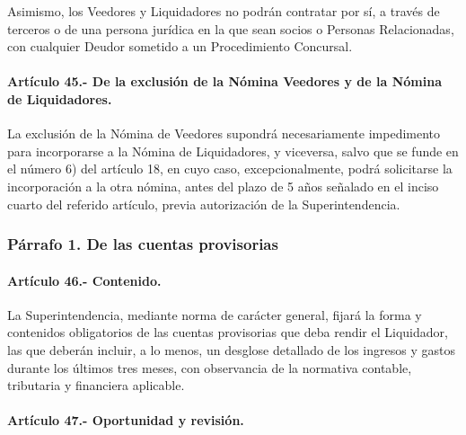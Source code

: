 \documentclass[
]{book}
\begin{document}
Asimismo, los Veedores y Liquidadores no podrán contratar por sí, a través de terceros o de una persona jurídica en la que sean socios o Personas Relacionadas, con cualquier Deudor sometido a un Procedimiento Concursal.

\hypertarget{artuxedculo-45.--de-la-exclusiuxf3n-de-la-nuxf3mina-veedores-y-de-la-nuxf3mina-de-liquidadores.}{%
\paragraph*{Artículo 45.- De la exclusión de la Nómina Veedores y de la Nómina de Liquidadores.}\label{artuxedculo-45.--de-la-exclusiuxf3n-de-la-nuxf3mina-veedores-y-de-la-nuxf3mina-de-liquidadores.}}

La exclusión de la Nómina de Veedores supondrá necesariamente impedimento para incorporarse a la Nómina de Liquidadores, y viceversa, salvo que se funde en el número 6) del artículo 18, en cuyo caso, excepcionalmente, podrá solicitarse la incorporación a la otra nómina, antes del plazo de 5 años señalado en el inciso cuarto del referido artículo, previa autorización de la Superintendencia.

\hypertarget{puxe1rrafo-1.-de-las-cuentas-provisorias}{%
\subsubsection*{Párrafo 1. De las cuentas provisorias}\label{puxe1rrafo-1.-de-las-cuentas-provisorias}}

\hypertarget{artuxedculo-46.--contenido.}{%
\paragraph*{Artículo 46.- Contenido.}\label{artuxedculo-46.--contenido.}}

La Superintendencia, mediante norma de carácter general, fijará la forma y contenidos obligatorios de las cuentas provisorias que deba rendir el Liquidador, las que deberán incluir, a lo menos, un desglose detallado de los ingresos y gastos durante los últimos tres meses, con observancia de la normativa contable, tributaria y financiera aplicable.

\hypertarget{artuxedculo-47.--oportunidad-y-revisiuxf3n.}{%
\paragraph*{Artículo 47.- Oportunidad y revisión.}\label{artuxedculo-47.--oportunidad-y-revisiuxf3n.}}
\end{document}
